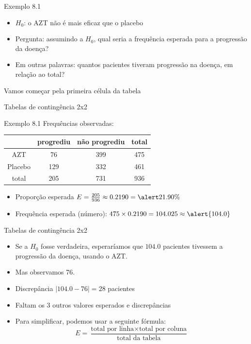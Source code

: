 \documentclass{beamer}
\begin{document}
\begin{frame}{Exemplo 8.1}
  \begin{itemize}
  \item $H_0$: o AZT não é mais eficaz que o placebo
  \item Pergunta: assumindo a $H_0$, qual seria a frequência esperada
    para a progressão da doença?
  \item Em outras palavras: quantos pacientes tiveram progressão na
    doença, em relação ao total?
  \end{itemize}
\end{frame}

\begin{frame}
  \begin{center}
    Vamos começar pela primeira célula da tabela
  \end{center}
\end{frame}

\begin{frame}{Tabelas de contingência 2x2}
  \begin{exampleblock}{Exemplo 8.1}
    Frequências observadas:
    \begin{tabular}{c|c|c|c}
      & progrediu & não progrediu & total\\
      \hline
      AZT & 76 & 399 & 475\\
      \hline
      Placebo & 129 & 332 & 461\\
      \hline
      total & \alert{205} & 731 & \alert{936}\\
    \end{tabular}
  \end{exampleblock}
  \vfill
  \begin{itemize}
    \footnotesize
  \item Proporção esperada $E = \frac{205}{936} \approx 0.2190 = \alert{21.90\%}$
  \item Frequência esperada (número): $475 \times 0.2190 = 104.025 \approx \alert{104.0}$
  \end{itemize}
\end{frame}

\begin{frame}{Tabelas de contingência 2x2}
  \begin{itemize}
    \small
  \item Se a $H_0$ fosse verdadeira, esperaríamos que $104.0$
    pacientes tivessem a progressão da doença, usando o AZT.
    \bigskip
  \item Mas observamos 76.
  \item Discrepância $|104.0 - 76| = 28$ pacientes
    \bigskip
    \bigskip
    \footnotesize
  \item Faltam os 3 outros valores esperados e discrepâncias
    \bigskip
    \bigskip
  \item Para simplificar, podemos usar a seguinte fórmula:
  \begin{displaymath}
    E = \frac{ \text{total por linha} \times \text{total por coluna}
    }{ \text{total da tabela} }
  \end{displaymath}
  \end{itemize}
\end{frame}
\end{document}
